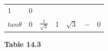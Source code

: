 {{\begin{center}
\begin{tabular}[t]{|l|l|l|l|l|l|l|}
        1 &
        0%
     \tabularnewline\cline{1-1}\cline{2-2}\cline{3-3}\cline{4-4}\cline{5-5}\cline{6-6}\cline{7-7}
                $tan\theta $
               &
        0 &
                $\frac{1}{\sqrt{3}}$
               &
        1 &
                $\sqrt{3}$
               &
                $-$
               &
        0%
     \tabularnewline\cline{1-1}\cline{2-2}\cline{3-3}\cline{4-4}\cline{5-5}\cline{6-6}\cline{7-7}
    \end{tabular}
      \end{center}
    \begin{center}{\small\bfseries Table 14.3}\end{center}
}}
